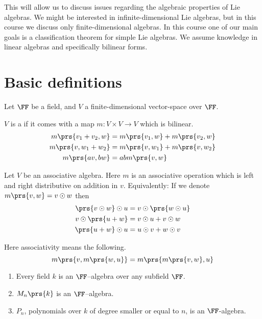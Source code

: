 \documentclass[10pt,a4paper,twoside,openany,hidelinks]{book}
\begin{document}
This will allow us to discuss issues regarding the algebraic properties of Lie algebras.
We might be interested in infinite-dimensional Lie algebras, but in this course we discuss only finite-dimensional algebras.
In this course one of our main goals is a classification theorem for simple Lie algebras.
We assume knowledge in linear algebras and specifically bilinear forms.

\section{Basic definitions}

Let $\FF$ be a field, and $V$ a finite-dimensional vector-space over $\FF$.

\begin{definition}
$V$ is a  if it comes with a map $m \colon V \times V \to V$ which is bilinear.
\begin{align*}
m\prs{v_1 + v_2, w} &= m\prs{v_1, w} + m\prs{v_2, w} \\
m\prs{v, w_1 + w_2} &= m\prs{v, w_1} + m\prs{v, w_2} \\
m\prs{av, bw} &= abm\prs{v,w}
\end{align*} 
\end{definition}
\begin{example}
Let $V$ be an associative algebra.
Here $m$ is an associative operation which is left and right distributive on addition in $v$.
Equivalently: If we denote $m\prs{v,w} = v \odot w$ then
\begin{align*}
\prs{v \odot w} \odot u &= v \odot \prs{w \odot u} \\
v \odot \prs{u+w} &= v\odot u + v\odot w \\
\prs{u+w}\odot u &= u\odot v + w\odot v
\end{align*}
\end{example}
\begin{remark}
Here associativity means the following.
\[m\prs{v, m\prs{w,u}} = m\prs{m\prs{v,w},u}\]
\end{remark}
\begin{examples}
\begin{enumerate}
\item Every field $k$ is an $\FF$–algebra over any subfield $\FF$.

\item $M_n\prs{k}$ is an $\FF$–algebra.

\item $P_n$, polynomials over $k$ of degree smaller or equal to $n$, is an $\FF$-algebra.
\end{enumerate}
\end{examples}
\end{document}
